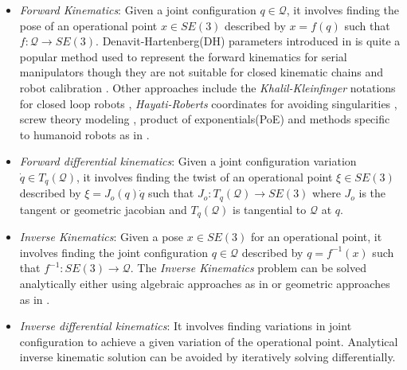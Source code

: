 \begin{itemize}
    \item \textit{Forward Kinematics}: Given a joint configuration $q \in \mathcal{Q}$, it involves finding the pose of an operational point $x \in SE(3)$ described by $x = f(q)$ such that $f:\mathcal{Q} \rightarrow SE(3)$. Denavit-Hartenberg(DH) parameters \cite{hartenberg1955kinematic} introduced in \cite{craig2005introduction} is quite a popular method used to represent the forward kinematics for serial manipulators though they are not suitable for closed kinematic chains and robot calibration \cite{khalil2004modeling,everett1987kinematic}. Other approaches include the \textit{Khalil-Kleinfinger} notations for closed loop robots \cite{khalil2004modeling}, \textit{Hayati-Roberts} coordinates for avoiding singularities \cite{hayati1985improving, roberts1988new}, screw theory modeling \cite{tsai1999robot}, product of exponentials(PoE) \cite{park1994computational} and methods 
    specific to humanoid robots as in \cite{kajita2005humanoid}.

    \item \textit{Forward differential kinematics}: Given a joint configuration variation $\dot{q} \in T_q(\mathcal{Q})$, it involves finding the twist of an operational point $\xi \in SE(3)$ described by  $\xi = J_o(q)\dot{q}$ such that  $J_o:T_q(\mathcal{Q}) \rightarrow SE(3)$ where $J_o$ is the tangent or geometric jacobian \cite{spong2006robot,Khatib1987} and $T_q(\mathcal{Q})$ is tangential to $\mathcal{Q}$ at $q$.
    \item \textit{Inverse Kinematics}: Given a pose $x \in SE(3)$ for an operational point, it involves finding the joint configuration
    $ q \in \mathcal{Q}$ described by $q = f^{-1}(x)$ such that $f^{-1}:SE(3) \rightarrow \mathcal{Q} $. The \textit{Inverse Kinematics} problem can be solved analytically either using algebraic approaches as in \cite{paul1robot} \cite{RaghvanBoth1993inverse} or geometric approaches as in \cite{paden1985kinematics, peiper1968kinematics}.

    \item \textit{Inverse differential kinematics}: It involves finding variations in joint configuration to achieve a given variation of the operational point. Analytical inverse kinematic solution can be avoided by iteratively solving differentially. 
\end{itemize}

